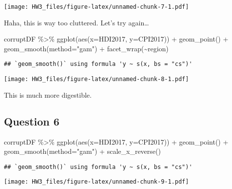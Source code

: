 \documentclass[
]{article}
\newenvironment{Shaded}{\begin{snugshade}}{\end{snugshade}}
\newcommand{\AttributeTok}[1]{\textcolor[rgb]{0.77,0.63,0.00}{#1}}
\newcommand{\FunctionTok}[1]{\textcolor[rgb]{0.00,0.00,0.00}{#1}}
\newcommand{\NormalTok}[1]{#1}
\newcommand{\SpecialCharTok}[1]{\textcolor[rgb]{0.00,0.00,0.00}{#1}}
\newcommand{\StringTok}[1]{\textcolor[rgb]{0.31,0.60,0.02}{#1}}
\begin{document}
\texttt{[image: HW3\_files/figure-latex/unnamed-chunk-7-1.pdf]}

Haha, this is way too cluttered. Let's try again\ldots{}

\begin{Shaded}
\begin{Highlighting}[]
\NormalTok{corruptDF }\SpecialCharTok{\%\textgreater{}\%} 
  \FunctionTok{ggplot}\NormalTok{(}\FunctionTok{aes}\NormalTok{(}\AttributeTok{x=}\NormalTok{HDI2017,}
             \AttributeTok{y=}\NormalTok{CPI2017)) }\SpecialCharTok{+}
  \FunctionTok{geom\_point}\NormalTok{() }\SpecialCharTok{+}
  \FunctionTok{geom\_smooth}\NormalTok{(}\AttributeTok{method=}\StringTok{"gam"}\NormalTok{) }\SpecialCharTok{+}
  \FunctionTok{facet\_wrap}\NormalTok{(}\SpecialCharTok{\textasciitilde{}}\NormalTok{region)}
\end{Highlighting}
\end{Shaded}

\begin{verbatim}
## `geom_smooth()` using formula 'y ~ s(x, bs = "cs")'
\end{verbatim}

\texttt{[image: HW3\_files/figure-latex/unnamed-chunk-8-1.pdf]}

This is much more digestible.

\hypertarget{question-6}{%
\subsection{Question 6}\label{question-6}}

\begin{Shaded}
\begin{Highlighting}[]
\NormalTok{corruptDF }\SpecialCharTok{\%\textgreater{}\%} 
  \FunctionTok{ggplot}\NormalTok{(}\FunctionTok{aes}\NormalTok{(}\AttributeTok{x=}\NormalTok{HDI2017,}
             \AttributeTok{y=}\NormalTok{CPI2017)) }\SpecialCharTok{+}
  \FunctionTok{geom\_point}\NormalTok{() }\SpecialCharTok{+}
  \FunctionTok{geom\_smooth}\NormalTok{(}\AttributeTok{method=}\StringTok{"gam"}\NormalTok{) }\SpecialCharTok{+}
  \FunctionTok{scale\_x\_reverse}\NormalTok{()}
\end{Highlighting}
\end{Shaded}

\begin{verbatim}
## `geom_smooth()` using formula 'y ~ s(x, bs = "cs")'
\end{verbatim}

\texttt{[image: HW3\_files/figure-latex/unnamed-chunk-9-1.pdf]}
\end{document}
